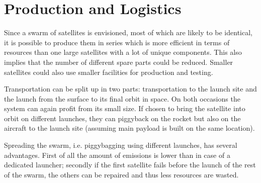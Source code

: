\section{Production and Logistics}
\label{blSSPRO}

Since a swarm of satellites is envisioned, most of which are likely to be identical, it is possible to produce them in series which is more efficient in terms of resources than one large satellites with a lot of unique components. This also implies that the number of different spare parts could be reduced. Smaller satellites could also use smaller facilities for production and testing. 

Transportation can be split up in two parts: transportation to the launch site and the launch from the surface to its final orbit in space. On both occasions the system can again profit from its small size. If chosen to bring the satellite into orbit on different launches, they can piggyback on the rocket but also on the aircraft to the launch site (assuming main payload is built on the same location).

Spreading the swarm, i.e. piggybagging using different launches, has several advantages. First of all the amount of emissions is lower than in case of a dedicated launcher; secondly if the first satellite fails before the launch of the rest of the swarm, the others can be repaired and thus less resources are wasted.